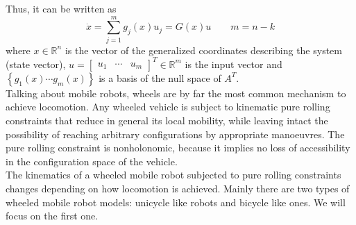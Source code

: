 Thus, it can be written as
\begin{equation} \label{G}
\dot{x}=\sum_{j=1}^{m} g_j(x)u_j=G(x)u \qquad m=n-k
\end{equation}
where $x\in \mathbb{R}^n $ is the vector of the generalized coordinates describing the system (state vector), $u= \left[
\begin{matrix}
u_1 &  \cdots & u_m
\end{matrix}
\right]^T\in\mathbb{R}^m $ is the input vector and $\left\lbrace  g_1(x) \cdots g_m(x) \right\rbrace $ is a basis of the null space of $A^T$.\\ 
Talking about mobile robots, wheels are by far the most common mechanism to achieve locomotion. Any wheeled vehicle is subject to kinematic pure rolling constraints that reduce in general its local mobility, while leaving intact the possibility of reaching arbitrary configurations by appropriate manoeuvres. The pure rolling constraint is nonholonomic, because it implies no loss of accessibility in the configuration space of the vehicle.\\
The kinematics of a wheeled mobile robot subjected to pure rolling constraints changes depending on how locomotion is achieved. Mainly there are two types of wheeled mobile robot models: unicycle like robots and bicycle like ones. We will focus on the first one.
